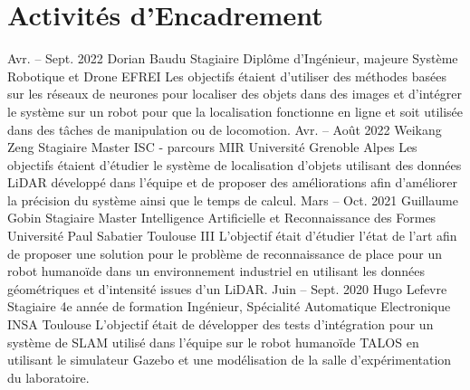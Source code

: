 \documentclass[11pt,a4paper,sans]{moderncv}         %
\begin{document}
\section{Activit\'es d'Encadrement}
\cventry
{Avr. -- Sept. 2022}
{Dorian Baudu}
{Stagiaire}
{Dipl\^ome d'Ing\'enieur, majeure Syst\`eme Robotique et Drone}
{EFREI}
{
  Les objectifs \'etaient d'utiliser des m\'ethodes bas\'ees sur les r\'eseaux de neurones pour localiser des objets dans des images et d'int\'egrer le syst\`eme sur un robot pour que la localisation fonctionne en ligne et soit utilis\'ee dans des t\^aches de manipulation ou de locomotion.
}
%
\cventry
{Avr. -- Ao\^ut 2022}
{Weikang Zeng}
{Stagiaire}
{Master ISC - parcours MIR}
{Universit\'e Grenoble Alpes}
{
  Les objectifs \'etaient d'\'etudier le syst\`eme de localisation d'objets utilisant des donn\'ees LiDAR d\'evelopp\'e dans l'\'equipe et de proposer des am\'eliorations afin d'am\'eliorer la pr\'ecision du syst\`eme ainsi que le temps de calcul.
}
%
\cventry
{Mars -- Oct. 2021}
{Guillaume Gobin}
{Stagiaire}
{Master Intelligence Artificielle et Reconnaissance des Formes}
{Universit\'e Paul Sabatier Toulouse III}
{
  L'objectif \'etait d'\'etudier l'\'etat de l'art afin de proposer une solution pour le probl\`eme de reconnaissance de place pour un robot humano\"ide dans un environnement industriel en utilisant les donn\'ees g\'eom\'etriques et d'intensit\'e issues d'un LiDAR.
}
%
\cventry
{Juin -- Sept. 2020}
{Hugo Lefevre}
{Stagiaire}
{4e ann\'ee de formation Ing\'enieur, Sp\'ecialit\'e Automatique Electronique}
{INSA Toulouse}
{
  L'objectif \'etait de d\'evelopper des tests d'int\'egration pour un syst\`eme de SLAM utilis\'e dans l'\'equipe sur le robot humano\"ide TALOS en utilisant le simulateur Gazebo et une mod\'elisation de la salle d'exp\'erimentation du laboratoire.
}
%
\end{document}
